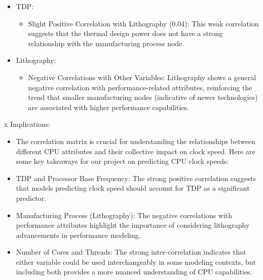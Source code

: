 \begin{itemize}
    \item TDP:
    \begin{itemize}
        \item Slight Positive Correlation with Lithography (0.04): This weak correlation suggests that the thermal design power does not have a strong relationship with the manufacturing process node.
    \end{itemize}
    
    \item Lithography:
    \begin{itemize}
        \item Negative Correlations with Other Variables: Lithography shows a general negative correlation with performance-related attributes, reinforcing the trend that smaller manufacturing nodes (indicative of newer technologies) are associated with higher performance capabilities.
    \end{itemize}
\end{itemize}
x
Implications:
\begin{itemize}
    \item The correlation matrix is crucial for understanding the relationships between different CPU attributes and their collective impact on clock speed. Here are some key takeaways for our project on predicting CPU clock speeds:
    
    \item TDP and Processor Base Frequency: The strong positive correlation suggests that models predicting clock speed should account for TDP as a significant predictor.
    
    \item Manufacturing Process (Lithography): The negative correlations with performance attributes highlight the importance of considering lithography advancements in performance modeling.
    
    \item Number of Cores and Threads: The strong inter-correlation indicates that either variable could be used interchangeably in some modeling contexts, but including both provides a more nuanced understanding of CPU capabilities.
\end{itemize}


\newpage